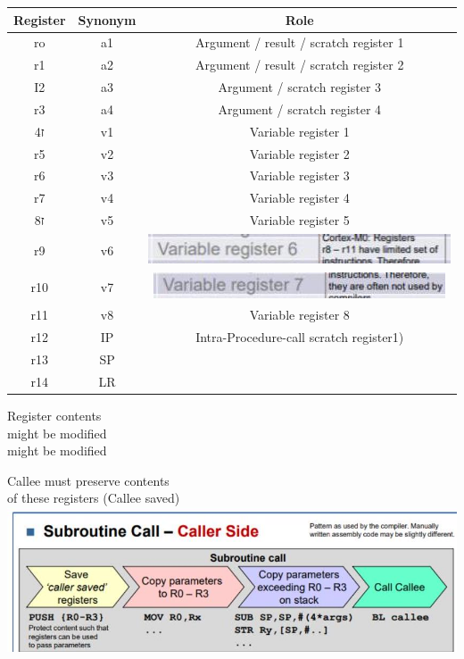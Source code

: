 \documentclass[10pt]{article}
\begin{document}
\begin{center}
\begin{tabular}{|c|c|c|}
\hline
Register & Synonym & Role \\
\hline
ro & a1 & Argument / result / scratch register 1 \\
\hline
r1 & a2 & Argument / result / scratch register 2 \\
\hline
I2 & a3 & Argument / scratch register 3 \\
\hline
r3 & a4 & Argument / scratch register 4 \\
\hline
ז4 & v1 & Variable register 1 \\
\hline
r5 & v2 & Variable register 2 \\
\hline
r6 & v3 & Variable register 3 \\
\hline
r7 & v4 & Variable register 4 \\
\hline
ז8 & v5 & Variable register 5 \\
\hline
r9 & v6 & \includegraphics[max width=\textwidth]{2024_12_29_79e6b22f503fb7b4f718g-09}
 \\
\hline
r10 & v7 & \includegraphics[max width=\textwidth]{2024_12_29_79e6b22f503fb7b4f718g-09(1)}
 \\
\hline
r11 & v8 & Variable register 8 \\
\hline
r12 & IP & Intra-Procedure-call scratch register1) \\
\hline
r13 & SP &  \\
\hline
r14 & LR &  \\
\hline
\end{tabular}
\end{center}

Register contents\\
might be modified\\
might be modified

Callee must preserve contents\\
of these registers (Callee saved)\\
\includegraphics[max width=\textwidth, center]{2024_12_29_79e6b22f503fb7b4f718g-09(3)}
\end{document}

